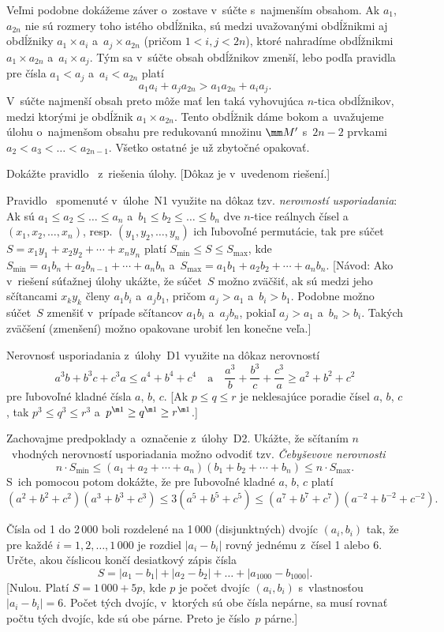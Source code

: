 {Veľmi podobne dokážeme záver o~zostave v~súčte s~najmenším
obsahom. Ak $a_1$, $a_{2n}$ nie sú rozmery toho istého obdĺžnika,
sú medzi uvažovanými obdĺžnikmi aj obdĺžniky $a_1\times a_i$
a~$a_j\times a_{2n}$ (pričom $1<i,j<2n$), ktoré nahradíme obdĺžnikmi
$a_1\times a_{2n}$ a~$a_i\times a_j$. Tým sa v~súčte obsah obdĺžnikov
zmenší, lebo podľa pravidla~ pre čísla $a_1<a_j$ a~$a_i<a_{2n}$ platí
$$
a_1a_i+a_ja_{2n}>a_1a_{2n}+a_ia_j.
$$
V~súčte najmenší obsah preto
môže mať len taká vyhovujúca $n$-tica obdĺžnikov,
medzi ktorými je obdĺžnik $a_1\times a_{2n}$. Tento obdĺžnik dáme bokom
a~uvažujeme úlohu o~najmenšom obsahu
pre redukovanú množinu $\mm M'$ s~$2n-2$ prvkami
$a_2<a_3<\dots<a_{2n-1}$. Všetko ostatné je už zbytočné opakovať.

Dokážte pravidlo~ z~riešenia úlohy. [Dôkaz je v~uvedenom riešení.]

\D%
Pravidlo~ spomenuté v~úlohe~N1 využite na dôkaz tzv. {\it
nerovností usporiadania}: Ak sú $a_1\le a_2\le\dots\le a_n$
a~$b_1\le b_2\le\dots\le b_n$ dve $n$-tice reálnych čísel
a~$(x_1,x_2,\dots,x_n)$, resp. $(y_1,y_2,\dots,y_n)$ ich
ľubovoľné permutácie, tak pre súčet
$S=x_1y_1+x_2y_2+\cdots+x_ny_n$ platí
$S_{\min}\le S\le S_{\max}$, kde
$S_{\min}=a_1b_n+a_2b_{n-1}+\cdots+a_nb_n$
a~$S_{\max}=a_1b_1+a_2b_2+\cdots+a_nb_n$.
[Návod: Ako v~riešení súťažnej úlohy ukážte, že súčet~$S$
možno zväčšiť, ak sú medzi jeho sčítancami
$x_ky_k$ členy $a_1b_i$ a~$a_jb_1$, pričom $a_j>a_1$
a~$b_i>b_1$. Podobne možno súčet~$S$ zmenšiť v~prípade sčítancov
$a_1b_i$ a~$a_jb_n$, pokiaľ $a_j>a_1$ a~$b_n>b_i$. Takých
zväčšení (zmenšení) možno opakovane urobiť len konečne veľa.]

Nerovnosť usporiadania z~úlohy~D1 využite na dôkaz nerovností
$$
a^3b+b^3c+c^3a\le a^4+b^4+c^4\quad\text{a}\quad
\frac{a^3}{b}+\frac{b^3}{c}+\frac{c^3}{a}\ge a^2+b^2+c^2
$$
pre ľubovoľné kladné čísla $a$, $b$, $c$. [Ak $p\le q\le r$ je neklesajúce
poradie čísel $a$, $b$, $c$, tak $p^3\le q^3\le r^3$
a~$p^{\m1}\ge q^{\m1}\ge r^{\m1}$.]

Zachovajme predpoklady a~označenie z~úlohy~D2.
Ukážte, že sčítaním $n$~vhodných
nerovností usporiadania možno odvodiť tzv. {\it Čebyševove
nerovnosti}
$$
n\cdot S_{\min}\le(a_1+a_2+\cdots+a_n)(b_1+b_2+\cdots+b_n)\le
n\cdot S_{\max}.
$$
S~ich pomocou potom dokážte, že pre ľubovoľné kladné $a$, $b$, $c$
platí
$$
(a^2+b^2+c^2)(a^3+b^3+c^3)\le 3(a^5+b^5+c^5)\le
(a^7+b^7+c^7)(a^{-2}+b^{-2}+c^{-2}).
$$

Čísla od 1 do 2\,000 boli rozdelené na 1\,000 (disjunktných)
dvojíc $(a_i,b_i)$ tak, že pre každé $i=1,2,\dots,1\,000$ je
rozdiel $|a_i-b_i|$ rovný jednému z~čísel 1 alebo 6. Určte, akou
číslicou končí desiatkový zápis čísla
$$
S=|a_1-b_1|+|a_2-b_2|+\dots+|a_{1000}-b_{1000}|.
$$
[Nulou. Platí $S=1\,000+5p$, kde $p$ je počet dvojíc $(a_i,b_i)$
s~vlastnosťou $|a_i-b_i|=6$. Počet tých dvojíc, v~ktorých sú
obe čísla nepárne, sa musí rovnať počtu tých dvojíc, kde sú obe
párne. Preto je číslo~$p$ párne.]

}

